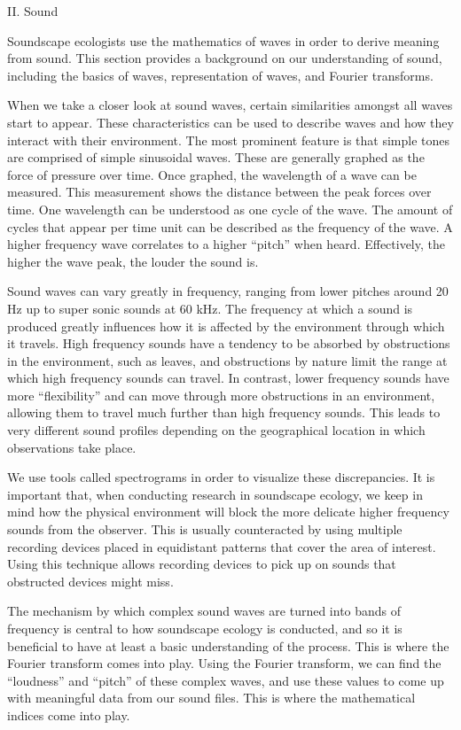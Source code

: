 \begin{center}
II. Sound
\end{center}
\begin{flushleft}
\setlength{\parindent}{0.125in}
Soundscape ecologists use the mathematics of waves in order to derive meaning from sound. This section provides a background on our understanding of sound, including the basics of waves, representation of waves, and Fourier transforms.\par

When we take a closer look at sound waves, certain similarities amongst all waves start to appear. These characteristics can be used to describe waves and how they interact with their environment. The most prominent feature is that simple tones are comprised of simple sinusoidal waves. These are generally graphed as the force of pressure over time. Once graphed, the wavelength of a wave can be measured. This measurement shows the distance between the peak forces over time. One wavelength can be understood as one cycle of the wave. The amount of cycles that appear per time unit can be described as the frequency of the wave. A higher frequency wave correlates to a higher ``pitch'' when heard. Effectively, the higher the wave peak, the louder the sound is.\par

Sound waves can vary greatly in frequency, ranging from lower pitches around 20 Hz up to super sonic sounds at 60 kHz. The frequency at which a sound is produced greatly influences how it is affected by the environment through which it travels. High frequency sounds have a tendency to be absorbed by obstructions in the environment, such as leaves, and obstructions by nature limit the range at which high frequency sounds can travel. In contrast, lower frequency sounds have more ``flexibility'' and can move through more obstructions in an environment, allowing them to travel much further than high frequency sounds. This leads to very different sound profiles depending on the geographical location in which observations take place.\par

We use tools called spectrograms in order to visualize these discrepancies. It is important that, when conducting research in soundscape ecology, we keep in mind how the physical environment will block the more delicate higher frequency sounds from the observer. This is usually counteracted by using multiple recording devices placed in equidistant patterns that cover the area of interest. Using this technique allows recording devices to pick up on sounds that obstructed devices might miss.\par

The mechanism by which complex sound waves are turned into bands of frequency is central to how soundscape ecology is conducted, and so it is beneficial to have at least a basic understanding of the process. This is where the Fourier transform comes into play. Using the Fourier transform, we can find the ``loudness'' and ``pitch'' of these complex waves, and use these values to come up with meaningful data from our sound files. This is where the mathematical indices come into play.
\end{flushleft}
